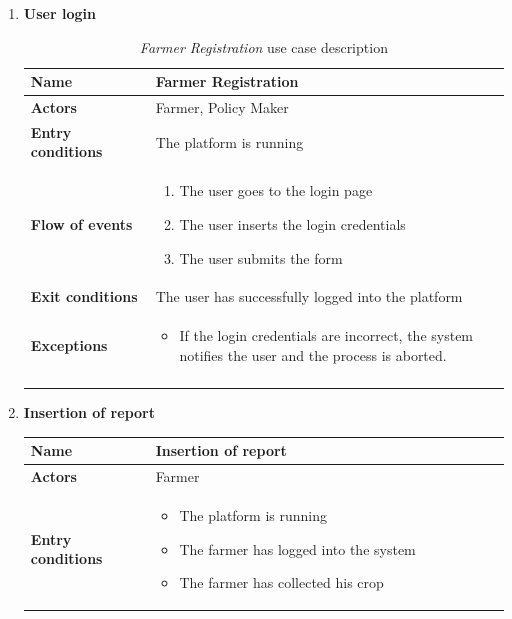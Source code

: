 \documentclass[10pt]{article}
\begin{document}
\begin{enumerate}[label=\textbf{UC\arabic*}]
    \newpage
    \item \label{uc:uc3} \textbf{User login} 
    \begin{longtable}{p{0.26\linewidth}p{0.75\linewidth}}
        \toprule
        \textbf{Name} & \textbf{Farmer Registration} \\
        \midrule
        \textbf{Actors} & Farmer, Policy Maker \\
        \midrule
        \textbf{Entry conditions} & The platform is running \\
        \midrule
        \textbf{Flow of events} & 
        \begin{enumerate}
            \item The user goes to the login page
            \item The user inserts the login credentials
            \item The user submits the form
        \end{enumerate} \\
        \midrule
        \textbf{Exit conditions} & The user has successfully logged into the platform\\
        \midrule
        \textbf{Exceptions} & 
        \begin{itemize}
            \item If the login credentials are incorrect, the system notifies the user and the process is aborted.
        \end{itemize} \\
        \bottomrule
        \caption{\emph{Farmer Registration} use case description}
    \end{longtable}
    \newpage
    \item \label{uc:uc4} \textbf{Insertion of report}
        \begin{longtable}{p{0.26\linewidth}p{0.75\linewidth}}
            \toprule
            \textbf{Name} & \textbf{Insertion of report} \\
            \midrule
            \textbf{Actors} & Farmer\\
            \midrule
            \textbf{Entry conditions} & 
            \begin{itemize}
                \item The platform is running
                \item The farmer has logged into the system
                \item The farmer has collected his crop
            \end{itemize}\\

\end{longtable}
\end{enumerate}
\end{document}
